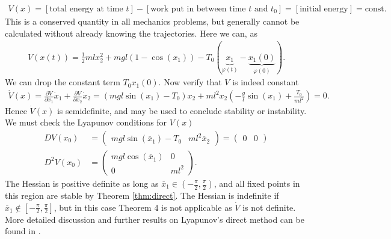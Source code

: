 \begin{ex}
\begin{align}
	V(x) = \left[  \textrm{total energy at time } t \right] - \left[  \textrm{work put in between time } t  \textrm{ and } t_0 \right] = \left[ \textrm{initial energy} \right] =  \textrm{const.}  
\end{align}
This is a conserved quantity in all mechanics problems, but generally cannot be calculated without already knowing the trajectories. Here we can, as
\begin{align}
	V(x(t)) = \frac{1}{2} ml x_2^2 + mgl(1- \cos(x_1)) - T_0(\underbrace{x_1}_{\varphi(t)} - \underbrace{x_1(0)}_{\varphi(0)}).
\end{align}
We can drop the constant term $T_0 x_1(0)$. Now verify that $V$ is indeed constant
\begin{align}
	\dot{V}(x) = \frac{\partial V}{\partial x_1} \dot{x}_1 + \frac{\partial V}{\partial x_2} \dot{x}_2 = \left( mgl \sin(x_1) - T_0\right) x_2 + ml^2x_2 \left( - \frac{g}{l}\sin(x_1) + \frac{T_0}{ml^2} \right) = 0.
\end{align}
Hence $\dot{V}(x)$ is semidefinite, and may be used to conclude stability or instability. We must check the Lyapunov conditions for $V(x)$ 
\begin{subequations}
\begin{align}
	DV(x_0) &= 
\begin{pmatrix}
	mgl \sin(\overline{x}_1) - T_0 & ml^2 \overline{x}_2
\end{pmatrix}
=
\begin{pmatrix}
	0& 0
\end{pmatrix}
\\
D^2V(x_0) &= 
\begin{pmatrix}
	mgl \cos(\overline{x}_1) & 0 \\
	0 & ml^2
\end{pmatrix}.
\end{align}\end{subequations}
The Hessian is positive definite as long as $\overline{x}_1 \in \left(-\frac{\pi }{2}, \frac{\pi }{2}\right)$, and all fixed points in this region are stable by Theorem \ref{thm:direct}. The Hessian is indefinite if $\overline{x}_1 \not \in \left[-\frac{\pi }{2}, \frac{\pi }{2}\right]$, but in this case Theorem 4 is not applicable as $\dot{V}$ is not definite. More detailed discussion and further results on Lyapunov's direct method can be found in \cite{LiapunovDirect}.
 \end{ex}
 
